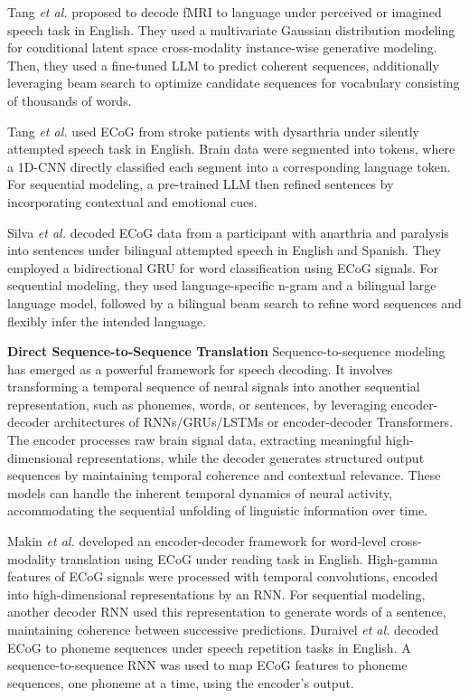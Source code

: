 \documentclass[journal]{IEEEtran}
\begin{document}
Tang \emph{et al.} \cite{Tang2023a} proposed to decode fMRI to language under perceived or imagined speech task in English. They used a multivariate Gaussian distribution modeling for conditional latent space cross-modality instance-wise generative modeling. Then, they used a fine-tuned LLM to predict coherent sequences, additionally leveraging beam search to optimize candidate sequences for vocabulary consisting of thousands of words.

Tang \emph{et al.} \cite{Tang2024} used ECoG from stroke patients with dysarthria under silently attempted speech task in English. Brain data were segmented into tokens, where a 1D-CNN directly classified each segment into a corresponding language token. For sequential modeling, a pre-trained LLM then refined sentences by incorporating contextual and emotional cues.

Silva \emph{et al.} \cite{Silva2024a} decoded ECoG data from a participant with anarthria and paralysis into sentences under bilingual attempted speech in English and Spanish. They employed a bidirectional GRU for word classification using ECoG signals. For sequential modeling, they used language-specific n-gram and a bilingual large language model, followed by a bilingual beam search to refine word sequences and flexibly infer the intended language.

\textbf{Direct Sequence-to-Sequence Translation} Sequence-to-sequence modeling has emerged as a powerful framework for speech decoding. It involves transforming a temporal sequence of neural signals into another sequential representation, such as phonemes, words, or sentences, by leveraging encoder-decoder architectures of RNNs/GRUs/LSTMs or encoder-decoder Transformers. The encoder processes raw brain signal data, extracting meaningful high-dimensional representations, while the decoder generates structured output sequences by maintaining temporal coherence and contextual relevance. These models can handle the inherent temporal dynamics of neural activity, accommodating the sequential unfolding of linguistic information over time.

Makin \emph{et al.} \cite{Makin2020} developed an encoder-decoder framework for word-level cross-modality translation using ECoG under reading task in English. High-gamma features of ECoG signals were processed with temporal convolutions, encoded into high-dimensional representations by an RNN. For sequential modeling, another decoder RNN used this representation to generate words of a sentence, maintaining coherence between successive predictions. Duraivel \emph{et al.} \cite{Duraivel2023} decoded ECoG to phoneme sequences under speech repetition tasks in English. A sequence-to-sequence RNN was used to map ECoG features to phoneme sequences, one phoneme at a time, using the encoder's output.
\end{document}
